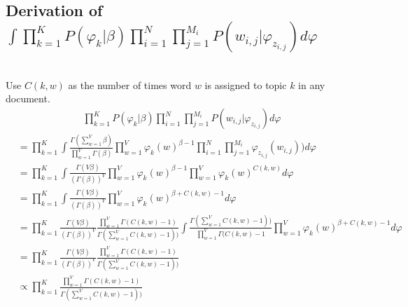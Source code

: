 \documentclass{article} %
\begin{document}
\begin{mdframed}
\subsection{Derivation of $\int \prod\limits_{k=1}^K P(\varphi_k|\beta) \prod^N_{i=1}\prod^{M_i}_{j=1} P(w_{i,j}|\varphi_{z_{i,j}}) d\varphi$}
~\\Use $C(k,w)$ as the number of times word $w$ is assigned to topic $k$ in any document.
\begin{align}
\prod\limits_{k=1}^K P(\varphi_k|\beta) \prod^N_{i=1}\prod^{M_i}_{j=1} P(w_{i,j}|\varphi_{z_{i,j}}) d\varphi
\end{align}
\begin{align}
&= \prod\limits_{k=1}^K \int\frac{\Gamma (\sum\limits_{w=1}^V \beta)}{\prod\limits_{w=1}^V \Gamma(\beta)} \prod\limits_{w=1}^V  \varphi_{k}(w)^{\beta-1}  \prod^N_{i=1}\prod^{M_i}_{j=1} \varphi_{z_{i,j}}(w_{i,j})) d\varphi\\
&= \prod\limits_{k=1}^K \int \frac{\Gamma (V \beta)}{(\Gamma(\beta))^V} \prod\limits_{w=1}^V  \varphi_{k}(w)^{\beta-1}  \prod\limits_{w=1}^V \varphi_{k}(w)^{C(k,w)} d\varphi\\
&= \prod\limits_{k=1}^K \int \frac{\Gamma (V \beta)}{(\Gamma(\beta))^V}  \prod\limits_{w=1}^V \varphi_{k}(w)^{\beta + C(k,w) -1} d\varphi\\
&= \prod\limits_{k=1}^K \frac{\Gamma (V \beta)}{(\Gamma(\beta))^V}  \frac{\prod\limits_{w=1}^V \Gamma(C(k,w)-1)}{\Gamma(\sum\limits_{w=1}^V C(k,w)-1))} \int \frac{\Gamma(\sum\limits_{w=1}^V C(k,w)-1))}{\prod\limits_{w=1}^V \Gamma(C(k,w)-1}  \prod\limits_{w=1}^V \varphi_{k}(w)^{\beta + C(k,w) -1} d\varphi\\
&=  \prod\limits_{k=1}^K \frac{\Gamma (V \beta)}{(\Gamma(\beta))^V}  \frac{\prod\limits_{w=1}^V \Gamma(C(k,w)-1)}{\Gamma(\sum\limits_{w=1}^V C(k,w)-1))}\\
&\propto \prod\limits_{k=1}^K \frac{\prod\limits_{w=1}^V \Gamma(C(k,w)-1)}{\Gamma(\sum\limits_{w=1}^V C(k,w)-1))}
\end{align}

\end{mdframed}
\end{document}
